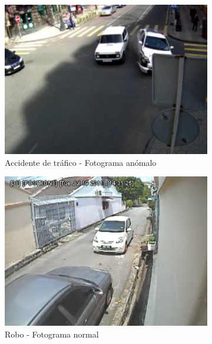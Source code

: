 \documentclass[../main.tex]{memoir}
\begin{document}
\begin{figure}[hbtp]
\begin{subfigure}{0.48\textwidth}
    \includegraphics[width=\linewidth]{images/ucf-examples/roadaccident-abnormal}
    \caption{Accidente de tráfico - Fotograma anómalo}
  \end{subfigure}
  \begin{subfigure}{0.48\textwidth}
    \centering
    \includegraphics[width=\linewidth]{images/ucf-examples/stealing-normal}
    \caption{Robo - Fotograma normal}
  \end{subfigure}
  \begin{subfigure}{0.48\textwidth}
    \centering

\end{subfigure}
\end{figure}
\end{document}
